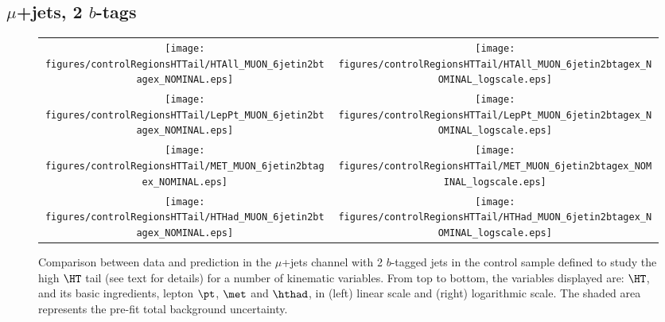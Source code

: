 \clearpage
\subsection{$\mu$+jets, 2 $b$-tags}
\label{sec:MUON_controlHTTail_2tagex}

\begin{figure}[htbp]
\begin{center}
\begin{tabular}{cc}
%
\texttt{[image: figures/controlRegionsHTTail/HTAll\_MUON\_6jetin2btagex\_NOMINAL.eps]} &
\texttt{[image: figures/controlRegionsHTTail/HTAll\_MUON\_6jetin2btagex\_NOMINAL\_logscale.eps]} \\
\texttt{[image: figures/controlRegionsHTTail/LepPt\_MUON\_6jetin2btagex\_NOMINAL.eps]} &
\texttt{[image: figures/controlRegionsHTTail/LepPt\_MUON\_6jetin2btagex\_NOMINAL\_logscale.eps]} \\
\texttt{[image: figures/controlRegionsHTTail/MET\_MUON\_6jetin2btagex\_NOMINAL.eps]} &
\texttt{[image: figures/controlRegionsHTTail/MET\_MUON\_6jetin2btagex\_NOMINAL\_logscale.eps]} \\
\texttt{[image: figures/controlRegionsHTTail/HTHad\_MUON\_6jetin2btagex\_NOMINAL.eps]} &
\texttt{[image: figures/controlRegionsHTTail/HTHad\_MUON\_6jetin2btagex\_NOMINAL\_logscale.eps]} \\

\end{tabular}\caption{\small {Comparison between data and prediction in the $\mu$+jets channel with 2 $b$-tagged jets in the control sample
defined to study the high $\HT$ tail (see text for details)  for a number of kinematic
variables. From top to bottom, the variables displayed are: $\HT$, and its basic ingredients, lepton $\pt$, $\met$ and $\hthad$,
in (left) linear scale and (right) logarithmic scale.
The shaded area represents the pre-fit total background uncertainty.}}
\label{fig:MUON_controlHTTail_2btagex_1}
\end{center}
\end{figure}
